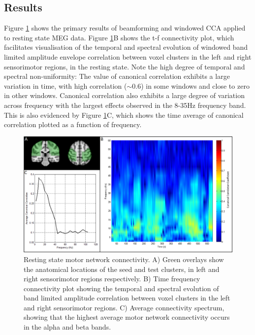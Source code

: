 \subsection{Results}
Figure \ref{fig_4_7} shows the primary results of beamforming and windowed CCA applied to resting state MEG data. Figure \ref{fig_4_7}B shows the t-f connectivity plot, which facilitates visualisation of the temporal and spectral evolution of windowed band limited amplitude envelope correlation between voxel clusters in the left and right sensorimotor regions, in the resting state. Note the high degree of temporal and spectral non-uniformity: The value of canonical correlation exhibits a large variation in time, with high correlation ($\sim$0.6) in some windows and close to zero in other windows. Canonical correlation also exhibits a large degree of variation across frequency with the largest effects observed in the 8-35Hz frequency band. This is also evidenced by Figure \ref{fig_4_7}C, which shows the time average of canonical correlation plotted as a function of frequency. 

\begin{figure}[h!]
	\includegraphics[width=\linewidth]{./images/chapter4/figure_7.png}\caption{Resting state motor network connectivity. A) Green overlays show the anatomical locations of the seed and test clusters, in left and right sensorimotor regions respectively. B) Time frequency connectivity plot showing the temporal and spectral evolution of band limited amplitude correlation between voxel clusters in the left and right sensorimotor regions. C) Average connectivity spectrum, showing that the highest average motor network connectivity occurs in the alpha and beta bands.}\label{fig_4_7}
\end{figure}

